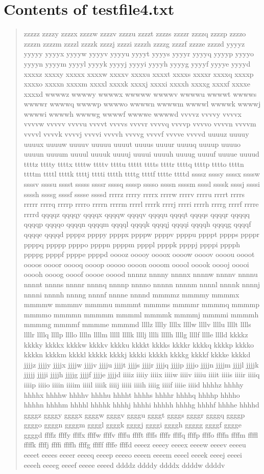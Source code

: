 \documentclass{article} %
\begin{document}
\section{Contents of testfile4.txt}
\begin{quote}
zzzzz zzzzy zzzzx zzzzw zzzzv zzzzu zzzzt zzzzs zzzzr zzzzq zzzzp zzzzo zzzzn zzzzm zzzzl zzzzk zzzzj zzzzi zzzzh zzzzg zzzzf zzzze zzzzd yyyyz yyyyy yyyyx yyyyw yyyyv yyyyu yyyyt yyyys yyyyr yyyyq yyyyp yyyyo yyyyn yyyym yyyyl yyyyk yyyyj yyyyi yyyyh yyyyg yyyyf yyyye yyyyd xxxxz xxxxy xxxxx xxxxw xxxxv xxxxu xxxxt xxxxs xxxxr xxxxq xxxxp xxxxo xxxxn xxxxm xxxxl xxxxk xxxxj xxxxi xxxxh xxxxg xxxxf xxxxe xxxxd wwwwz wwwwy wwwwx wwwww wwwwv wwwwu wwwwt wwwws wwwwr wwwwq wwwwp wwwwo wwwwn wwwwm wwwwl wwwwk wwwwj wwwwi wwwwh wwwwg wwwwf wwwwe wwwwd vvvvz vvvvy vvvvx vvvvw vvvvv vvvvu vvvvt vvvvs vvvvr vvvvq vvvvp vvvvo vvvvn vvvvm vvvvl vvvvk vvvvj vvvvi vvvvh vvvvg vvvvf vvvve vvvvd uuuuz uuuuy uuuux uuuuw uuuuv uuuuu uuuut uuuus uuuur uuuuq uuuup uuuuo uuuun uuuum uuuul uuuuk uuuuj uuuui uuuuh uuuug uuuuf uuuue uuuud ttttz tttty ttttx ttttw ttttv ttttu ttttt tttts ttttr ttttq ttttp tttto ttttn ttttm ttttl ttttk ttttj tttti tttth ttttg ttttf tttte ttttd ssssz ssssy ssssx ssssw ssssv ssssu sssst sssss ssssr ssssq ssssp sssso ssssn ssssm ssssl ssssk ssssj ssssi ssssh ssssg ssssf sssse ssssd rrrrz rrrry rrrrx rrrrw rrrrv rrrru rrrrt rrrrs rrrrr rrrrq rrrrp rrrro rrrrn rrrrm rrrrl rrrrk rrrrj rrrri rrrrh rrrrg rrrrf rrrre rrrrd qqqqz qqqqy qqqqx qqqqw qqqqv qqqqu qqqqt qqqqs qqqqr qqqqq qqqqp qqqqo qqqqn qqqqm qqqql qqqqk qqqqj qqqqi qqqqh qqqqg qqqqf qqqqe qqqqd ppppz ppppy ppppx ppppw ppppv ppppu ppppt pppps ppppr ppppq ppppp ppppo ppppn ppppm ppppl ppppk ppppj ppppi pppph ppppg ppppf ppppe ppppd ooooz ooooy oooox oooow oooov oooou oooot oooos oooor ooooq oooop ooooo oooon oooom ooool ooook ooooj ooooi ooooh oooog oooof ooooe ooood nnnnz nnnny nnnnx nnnnw nnnnv nnnnu nnnnt nnnns nnnnr nnnnq nnnnp nnnno nnnnn nnnnm nnnnl nnnnk nnnnj nnnni nnnnh nnnng nnnnf nnnne nnnnd mmmmz mmmmy mmmmx mmmmw mmmmv mmmmu mmmmt mmmms mmmmr mmmmq mmmmp mmmmo mmmmn mmmmm mmmml mmmmk mmmmj mmmmi mmmmh mmmmg mmmmf mmmme mmmmd llllz lllly llllx llllw llllv llllu llllt lllls llllr llllq llllp llllo lllln llllm lllll llllk llllj lllli llllh llllg llllf lllle lllld kkkkz kkkky kkkkx kkkkw kkkkv kkkku kkkkt kkkks kkkkr kkkkq kkkkp kkkko kkkkn kkkkm kkkkl kkkkk kkkkj kkkki kkkkh kkkkg kkkkf kkkke kkkkd jjjjz jjjjy jjjjx jjjjw jjjjv jjjju jjjjt jjjjs jjjjr jjjjq jjjjp jjjjo jjjjn jjjjm jjjjl jjjjk jjjjj jjjji jjjjh jjjjg jjjjf jjjje jjjjd iiiiz iiiiy iiiix iiiiw iiiiv iiiiu iiiit iiiis iiiir iiiiq iiiip iiiio iiiin iiiim iiiil iiiik iiiij iiiii iiiih iiiig iiiif iiiie iiiid hhhhz hhhhy hhhhx hhhhw hhhhv hhhhu hhhht hhhhs hhhhr hhhhq hhhhp hhhho hhhhn hhhhm hhhhl hhhhk hhhhj hhhhi hhhhh hhhhg hhhhf hhhhe hhhhd ggggz ggggy ggggx ggggw ggggv ggggu ggggt ggggs ggggr ggggq ggggp ggggo ggggn ggggm ggggl ggggk ggggj ggggi ggggh ggggg ggggf gggge ggggd ffffz ffffy ffffx ffffw ffffv ffffu fffft ffffs ffffr ffffq ffffp ffffo ffffn ffffm ffffl ffffk ffffj ffffi ffffh ffffg fffff ffffe ffffd eeeez eeeey eeeex eeeew eeeev eeeeu eeeet eeees eeeer eeeeq eeeep eeeeo eeeen eeeem eeeel eeeek eeeej eeeei eeeeh eeeeg eeeef eeeee eeeed ddddz ddddy ddddx ddddw ddddv 
\end{quote}
\end{document}
